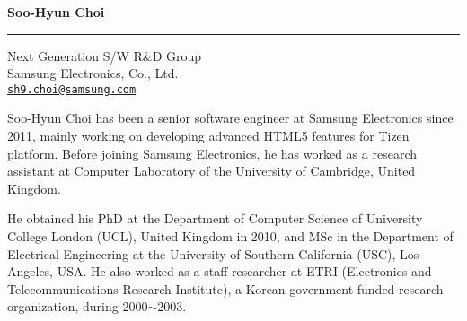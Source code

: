 \documentclass{letter} %
\begin{document}
\let\raggedleft\raggedright                %



\begin{center}
{\large\bf Soo-Hyun Choi}
\end{center}
\medskip\hrule height .5pt
\begin{center}
{{\sf Next Generation S/W R\&D Group \\ Samsung Electronics, Co., Ltd.} \\
{\small \href{mailto:sh9.choi@samsung.com}{\texttt{sh9.choi@samsung.com}}} 
}\\
\end{center}

\vspace{+2mm}

\noindent Soo-Hyun Choi has been a senior software engineer at Samsung 
Electronics since 2011, mainly working on developing advanced HTML5 features for 
Tizen platform. Before joining Samsung Electronics, he has worked as a research 
assistant at Computer Laboratory of the University of Cambridge, United Kingdom. 

He obtained his PhD at the Department of Computer Science of University College 
London (UCL), United Kingdom in 2010, and MSc in the Department of Electrical 
Engineering at the University of Southern California (USC), Los Angeles, USA. He 
also worked as a staff researcher at ETRI (Electronics and Telecommunications 
Research Institute), a Korean government-funded research organization, during 
2000$\sim$2003.

\end{document}
